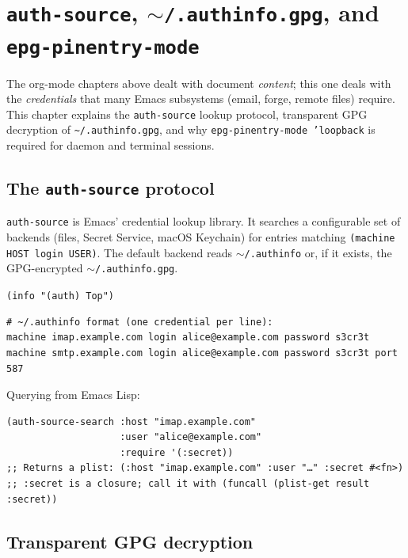 \chapter{\texttt{auth-source}, \texttt{$\sim$/.authinfo.gpg}, and \texttt{epg-pinentry-mode}}
\label{ch:auth-source}
\minitoc\label{auth-source-.authinfo.gpg-and-epg-pinentry-mode}

The org-mode chapters above dealt with document \emph{content};
this one deals with the \emph{credentials} that many Emacs
subsystems (email, forge, remote files) require.  This chapter explains the \texttt{auth-source} lookup
protocol, transparent GPG decryption of \texttt{\~{}/.authinfo.gpg},
and why \texttt{epg-pinentry-mode 'loopback} is required for daemon
and terminal sessions.

\section{The \texttt{auth-source} protocol}\label{the-auth-source-protocol}

\texttt{auth-source} is Emacs' credential lookup library. It searches a configurable set of backends (files, Secret Service, macOS Keychain) for entries matching \texttt{(machine HOST login USER)}. The default backend reads \texttt{$\sim$/.authinfo} or, if it exists, the GPG-encrypted \texttt{$\sim$/.authinfo.gpg}.

\texttt{(info "(auth) Top")}

\begin{verbatim}
# ~/.authinfo format (one credential per line):
machine imap.example.com login alice@example.com password s3cr3t
machine smtp.example.com login alice@example.com password s3cr3t port 587
\end{verbatim}

Querying from Emacs Lisp:

\begin{verbatim}
(auth-source-search :host "imap.example.com"
                    :user "alice@example.com"
                    :require '(:secret))
;; Returns a plist: (:host "imap.example.com" :user "…" :secret #<fn>)
;; :secret is a closure; call it with (funcall (plist-get result :secret))
\end{verbatim}

\section{Transparent GPG decryption}\label{transparent-gpg-decryption}

